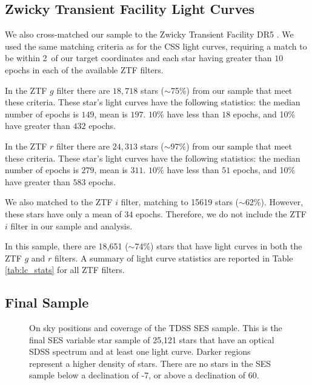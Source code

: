 \documentclass[twocolumn, tighten, astrosymb]{aastex631}
\begin{document}
\subsection{Zwicky Transient Facility Light Curves}\label{subsec:ztf}

We also cross-matched our sample to the Zwicky Transient Facility DR5 \citep[ZTF;][]{ZTF_1,ZTF_2,ZTF_3}. We used the same matching criteria as for the CSS light curves, requiring a match to be within 2\arcsec\ of our target coordinates and each star having greater than $10$ epochs in each of the available ZTF filters.

In the ZTF $g$ filter there are $18,718$ stars ($\sim$75\%) from our sample that meet these criteria. These star's light curves have the following statistics: the median number of epochs is $149$, mean is $197$. $10$\% have less than $18$ epochs, and 10\% have greater than $432$ epochs.

In the ZTF $r$ filter there are $24,313$ stars ($\sim$97\%) from our sample that meet these criteria. These star's light curves have the following statistics: the median number of epochs is $279$, mean is $311$. $10$\% have less than $51$ epochs, and 10\% have greater than $583$ epochs.

We also matched to the ZTF $i$ filter, matching to 15619 stars ($\sim$62\%). However, these stars have only a mean of $34$ epochs. Therefore, we do not include the ZTF $i$ filter in our sample and analysis. 

In this sample, there are 18,651 ($\sim$74\%) stars that have light curves in both the ZTF $g$ and $r$ filters. A summary of light curve statistics are reported in Table \ref{tab:lc_stats} for all ZTF filters. 

\subsection{Final Sample}\label{subsec:finalsample}


\begin{figure*}
\centering
\caption{On sky positions and coverage of the TDSS SES sample. This is the final SES variable star sample of 25,121 stars that have an optical SDSS spectrum and at least one light curve. Darker regions represent a higher density of stars. There are no stars in the SES sample below a declination of -7\degr, or above a declination of 60\degr.}
\label{fig:sample_onsky}
\end{figure*}
\end{document}
